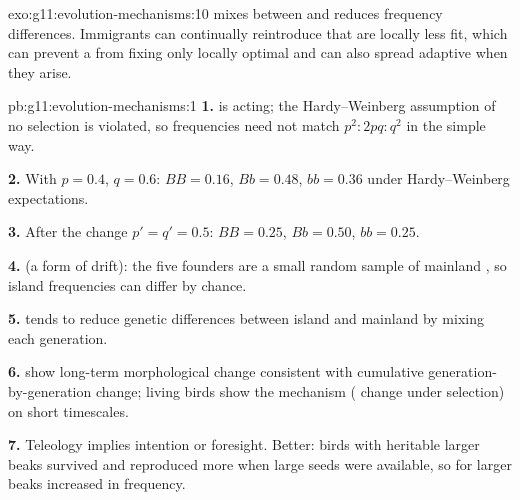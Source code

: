 \begin{solution}{exo:g11:evolution-mechanisms:10}
 mixes  between  and reduces frequency differences.
Immigrants can continually reintroduce  that are locally less fit,
which can prevent a  from fixing only locally optimal  and
can also spread adaptive  when they arise.
\end{solution}

\begin{solution}{pb:g11:evolution-mechanisms:1}
\textbf{1.}  is acting; the Hardy--Weinberg assumption of no
selection is violated, so  frequencies need not match $p^{2}:2pq:q^{2}$
in the simple way.

\textbf{2.} With $p = 0.4$, $q = 0.6$: $BB = 0.16$, $Bb = 0.48$, $bb = 0.36$
under Hardy--Weinberg expectations.

\textbf{3.} After the change $p' = q' = 0.5$: $BB = 0.25$, $Bb = 0.50$,
$bb = 0.25$.

\textbf{4.}  (a form of drift): the five founders are a small
random sample of mainland , so island frequencies can differ by chance.

\textbf{5.}  tends to reduce genetic differences between island and
mainland by mixing  each generation.

\textbf{6.}  show long-term morphological change consistent with
cumulative generation-by-generation change; living birds show the mechanism
( change under selection) on short timescales.

\textbf{7.} Teleology implies intention or foresight. Better: birds with
heritable larger beaks survived and reproduced more when large seeds were
available, so  for larger beaks increased in frequency.
\end{solution}

